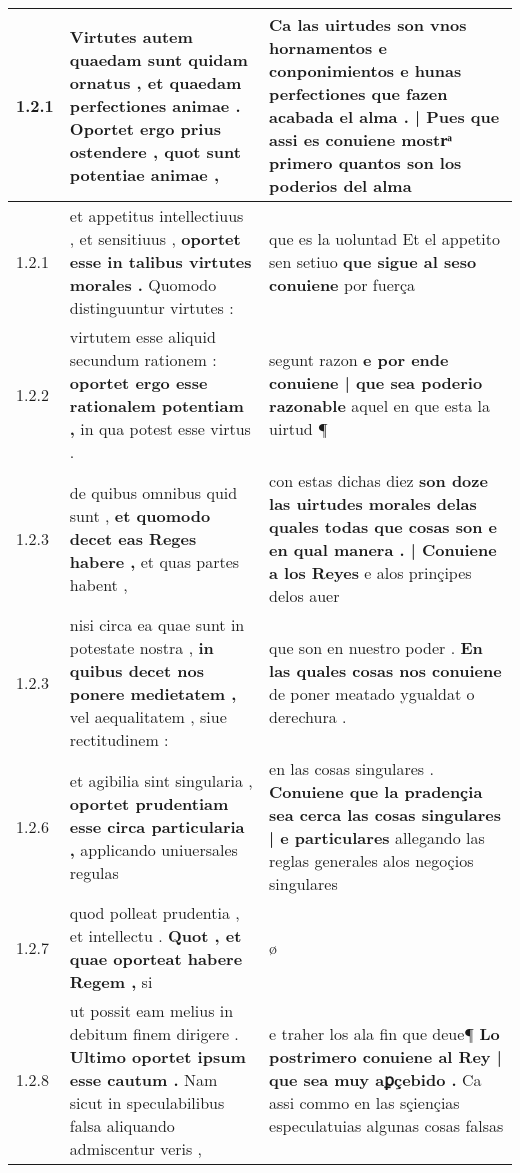 \begin{tabular}{|p{1cm}|p{6.5cm}|p{6.5cm}|}

\hline
1.2.1 & Virtutes autem quaedam sunt quidam ornatus , \textbf{ et quaedam perfectiones animae . Oportet ergo prius ostendere , } quot sunt potentiae animae , & Ca las uirtudes son vnos hornamentos e conponimientos e hunas perfectiones \textbf{ que fazen acabada el alma . | Pues que assi es conuiene } mostrͣ primero quantos son los poderios del alma \\\hline
1.2.1 & et appetitus intellectiuus , et sensitiuus , \textbf{ oportet esse in talibus virtutes morales . } Quomodo distinguuntur virtutes : & que es la uoluntad Et el appetito sen setiuo \textbf{ que sigue al seso conuiene } por fuerça \\\hline
1.2.2 & virtutem esse aliquid secundum rationem : \textbf{ oportet ergo esse rationalem potentiam , } in qua potest esse virtus . & segunt razon \textbf{ e por ende conuiene | que sea poderio razonable } aquel en que esta la uirtud ¶ \\\hline
1.2.3 & de quibus omnibus quid sunt , \textbf{ et quomodo decet eas Reges habere , } et quas partes habent , & con estas dichas diez \textbf{ son doze las uirtudes morales delas quales todas que cosas son e en qual manera . | Conuiene a los Reyes } e alos prinçipes delos auer \\\hline
1.2.3 & nisi circa ea quae sunt in potestate nostra , \textbf{ in quibus decet nos ponere medietatem , } vel aequalitatem , siue rectitudinem : & que son en nuestro poder . \textbf{ En las quales cosas nos conuiene } de poner meatado ygualdat o derechura . \\\hline
1.2.6 & et agibilia sint singularia , \textbf{ oportet prudentiam esse circa particularia , } applicando uniuersales regulas & en las cosas singulares . \textbf{ Conuiene que la pradençia sea cerca las cosas singulares | e particulares } allegando las reglas generales alos negoçios singulares \\\hline
1.2.7 & quod polleat prudentia , et intellectu . \textbf{ Quot , et quae oporteat habere Regem , } si & ø \\\hline
1.2.8 & ut possit eam melius in debitum finem dirigere . \textbf{ Ultimo oportet ipsum esse cautum . } Nam sicut in speculabilibus falsa aliquando admiscentur veris , & e traher los ala fin que deue¶ \textbf{ Lo postrimero conuiene al Rey | que sea muy aꝑçebido . } Ca assi commo en las sçiençias especulatuias algunas cosas falsas \\\hline

\end{tabular}
